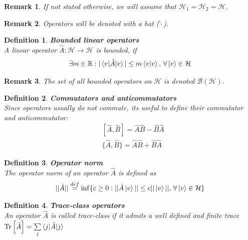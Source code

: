 \documentclass[12pt, a4paper,  nobibnotes]{article}
\newcommand{\Tr}[1]{\mathrm{Tr}\left[#1\right]}
\newtheorem{definition}{Definition}
\newtheorem{remark}{Remark}
\begin{document}
\begin{remark}
    If not stated otherwise, we will assume that $\mathcal H_1 = \mathcal H_2 = \mathcal H$.
\end{remark}

\begin{remark}
    Operators will be denoted with a hat ($\hat{\cdot}$).
\end{remark}

\begin{definition}
    \textbf{Bounded linear operators}\\
    A linear operator $\hat A: \mathcal H \rightarrow \mathcal H$ is bounded, if 
    \begin{equation*}
        \exists m \in \mathbb R : |\braket{v|\hat A | v}| \leq m\braket{v|v},\, \forall \ket v \in \mathcal H
    \end{equation*}
\end{definition}

\begin{remark}
    The set of all bounded operators on $\mathcal H$ is denoted $\mathcal{B(H)}$.
\end{remark}


\begin{definition}
    \textbf{Commutators and anticommutators}\\
    Since operators usually do not commute, its useful to define their commutator and anticommutator:
    \begin{align*}
        &[\hat A, \hat B] = \hat A\hat B - \hat B\hat A\\
        &\{\hat A, \hat B\} = \hat A\hat B + \hat B\hat A
    \end{align*}
\end{definition}

\begin{definition}
    \textbf{Operator norm}\\
    The operator norm of an operator $\hat A$ is defined as 
    \begin{equation*}
        ||\hat A|| \overset{def}{=} \inf\{c\geq 0 : ||\hat A\ket v || \leq c ||\ket v||,\,\forall \ket v \in \mathcal H \}
    \end{equation*}
\end{definition}

\begin{definition}
   \textbf{Trace-class operators}\\
   An operator $\hat A$ is called trace-class if it admits a well defined and finite trace 
   $\Tr{\hat A} = \sum\limits_j\braket{j|\hat A|j}$
\end{definition}
\end{document}
